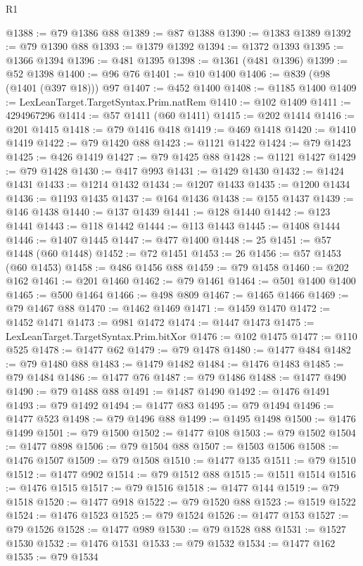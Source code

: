\begin{lexlean}{R1}
\begin{coremodule}
@1388 := @79 @1386 @88
@1389 := @87 @1388
@1390 := @1383 @1389
@1392 := @79 @1390 @88
@1393 := @1379 @1392
@1394 := @1372 @1393
@1395 := @1366 @1394
@1396 := @481 @1395
@1398 := @1361 (@481 @1396)
@1399 := @52 @1398
@1400 := @96 @76
@1401 := @10 @1400
@1406 := @839 (@98 (@1401 (@397 @18))) @97
@1407 := @452 @1400
@1408 := @1185 @1400
@1409 := LexLeanTarget.TargetSyntax.Prim.natRem
@1410 := @102 @1409
@1411 := 4294967296
@1414 := @57 @1411 (@60 @1411)
@1415 := @202 @1414
@1416 := @201 @1415
@1418 := @79 @1416 @418
@1419 := @469 @1418
@1420 := @1410 @1419
@1422 := @79 @1420 @88
@1423 := @1121 @1422
@1424 := @79 @1423
@1425 := @426 @1419
@1427 := @79 @1425 @88
@1428 := @1121 @1427
@1429 := @79 @1428
@1430 := @417 @993
@1431 := @1429 @1430
@1432 := @1424 @1431
@1433 := @1214 @1432
@1434 := @1207 @1433
@1435 := @1200 @1434
@1436 := @1193 @1435
@1437 := @164 @1436
@1438 := @155 @1437
@1439 := @146 @1438
@1440 := @137 @1439
@1441 := @128 @1440
@1442 := @123 @1441
@1443 := @118 @1442
@1444 := @113 @1443
@1445 := @1408 @1444
@1446 := @1407 @1445
@1447 := @477 @1400
@1448 := 25
@1451 := @57 @1448 (@60 @1448)
@1452 := @72 @1451
@1453 := 26
@1456 := @57 @1453 (@60 @1453)
@1458 := @486 @1456 @88
@1459 := @79 @1458
@1460 := @202 @162
@1461 := @201 @1460
@1462 := @79 @1461
@1464 := @501 @1400 @1400
@1465 := @500 @1464
@1466 := @498 @809
@1467 := @1465 @1466
@1469 := @79 @1467 @88
@1470 := @1462 @1469
@1471 := @1459 @1470
@1472 := @1452 @1471
@1473 := @981 @1472
@1474 := @1447 @1473
@1475 := LexLeanTarget.TargetSyntax.Prim.bitXor
@1476 := @102 @1475
@1477 := @110 @525
@1478 := @1477 @62
@1479 := @79 @1478
@1480 := @1477 @484
@1482 := @79 @1480 @88
@1483 := @1479 @1482
@1484 := @1476 @1483
@1485 := @79 @1484
@1486 := @1477 @76
@1487 := @79 @1486
@1488 := @1477 @490
@1490 := @79 @1488 @88
@1491 := @1487 @1490
@1492 := @1476 @1491
@1493 := @79 @1492
@1494 := @1477 @83
@1495 := @79 @1494
@1496 := @1477 @523
@1498 := @79 @1496 @88
@1499 := @1495 @1498
@1500 := @1476 @1499
@1501 := @79 @1500
@1502 := @1477 @108
@1503 := @79 @1502
@1504 := @1477 @898
@1506 := @79 @1504 @88
@1507 := @1503 @1506
@1508 := @1476 @1507
@1509 := @79 @1508
@1510 := @1477 @135
@1511 := @79 @1510
@1512 := @1477 @902
@1514 := @79 @1512 @88
@1515 := @1511 @1514
@1516 := @1476 @1515
@1517 := @79 @1516
@1518 := @1477 @144
@1519 := @79 @1518
@1520 := @1477 @918
@1522 := @79 @1520 @88
@1523 := @1519 @1522
@1524 := @1476 @1523
@1525 := @79 @1524
@1526 := @1477 @153
@1527 := @79 @1526
@1528 := @1477 @989
@1530 := @79 @1528 @88
@1531 := @1527 @1530
@1532 := @1476 @1531
@1533 := @79 @1532
@1534 := @1477 @162
@1535 := @79 @1534

\end{coremodule}
\end{lexlean}
